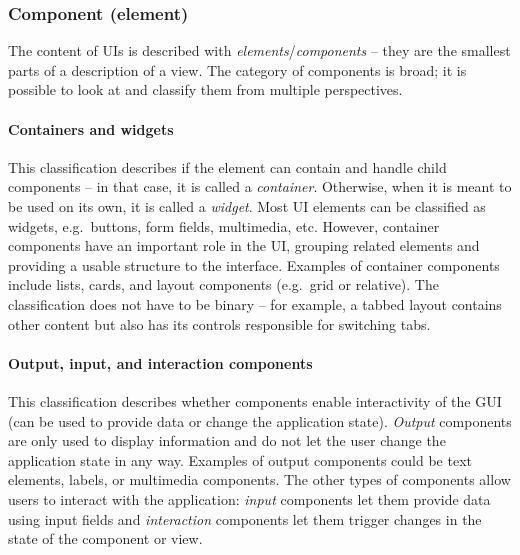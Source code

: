 \subsubsection{Component (element)}
The content of UIs is described with \emph{elements}/\emph{components} -- they are the smallest parts of a description of a view.
The category of components is broad;
it is possible to look at and classify them from multiple perspectives.

\paragraph{Containers and widgets}
This classification describes if the element can contain and handle child components -- in that case, it is called a \emph{container}.
Otherwise, when it is meant to be used on its own, it is called a \emph{widget}.
Most UI elements can be classified as widgets, e.g.\ buttons, form fields, multimedia, etc.
However, container components have an important role in the UI, grouping related elements and providing a usable structure to the interface.
Examples of container components include lists, cards, and layout components (e.g.\ grid or relative).
The classification does not have to be binary -- for example, a tabbed layout contains other content but also has its controls responsible for switching tabs.

\paragraph{Output, input, and interaction components}
This classification describes whether components enable interactivity of the GUI (can be used to provide data or change the application state).
\emph{Output} components are only used to display information and do not let the user change the application state in any way.
Examples of output components could be text elements, labels, or multimedia components.
The other types of components allow users to interact with the application: \emph{input} components let them provide data using input fields and \emph{interaction} components let them trigger changes in the state of the component or view.

